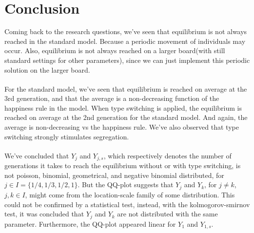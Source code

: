 \section{Conclusion}
Coming back to the research questions, we've seen that equilibrium is not always reached in the standard model. Because a periodic movement of individuals may occur. Also, equilibrium is not always reached on a larger board(with still standard settings for other parameters), since we can just implement this periodic solution on the larger board.\\
\\
For the standard model, we've seen that equilibrium is reached on average at the 3rd generation, and that the average is a non-decreasing function of the happiness rule in the model. When type switching is applied, the equilibrium is reached on average at the 2nd generation for the standard model. And again, the average is non-decreasing vs the happiness rule. We've also observed that type switching strongly stimulates segregation.\\
\\
We've concluded that $Y_j$ and $Y_{j,s}$, which respectively denotes the number of generations it takes to reach the equilibrium without or with type switching, is not poisson, binomial, geometrical, and negative binomial distributed, for $j\in I=\{1/4, 1/3, 1/2 ,1\}$. But the QQ-plot suggests that $Y_j$ and $Y_k$, for $j\neq k$, $j,k\in I$, might come from the location-scale family of some distribution. This could not be confirmed by a statistical test, instead, with the kolmogorov-smirnov test, it was concluded that $Y_j$ and $Y_k$ are not distributed with the same parameter. Furthermore, the QQ-plot appeared linear for $Y_1$ and $Y_{1,s}$.